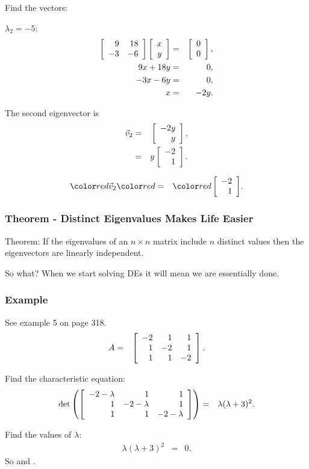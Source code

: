\begin{frame}
  Find the vectors:

  $\lambda_2 = -5$:
  \begin{eqnarray*}
    \left[ \begin{array}{rr} 9 & 18 \\ -3 & -6 \end{array} \right] \left[ \begin{array}{r} x \\ y \end{array} \right] & = & \left[ \begin{array}{r} 0 \\ 0 \end{array} \right], \\
    9x + 18y & = & 0, \\
    -3x - 6y & = & 0, \\
    x & = & -2 y.
  \end{eqnarray*}

  The second eigenvector is 
  \begin{eqnarray*}
    \vec{v}_2 & = & \left[ \begin{array}{r} -2y \\ y \end{array} \right], \\
    & = & y \left[ \begin{array}{r} -2 \\ 1 \end{array} \right].
  \end{eqnarray*}

  \begin{eqnarray*}
    \redText{\vec{v}_2} & \redText{=} & \redText{\vecTwo{-2}{1}}.
  \end{eqnarray*}

\end{frame}



\begin{frame}
  \frametitle{Theorem - Distinct Eigenvalues Makes Life Easier}

  Theorem: If the eigenvalues of an $n\times n$ matrix include $n$
  distinct values then the eigenvectors are linearly independent.

  \vfill

  {
    So what? When we start solving DEs it will mean we are essentially
    done. 
  }

  \vfill

\end{frame}



\begin{frame}
  \frametitle{Example}

  See example 5 on page 318.
  \begin{eqnarray*}
    A & = & \left[ \begin{array}{rrr} -2 & 1 & 1 \\ 1 & -2 & 1 \\ 1 & 1 & -2 \end{array} \right].
  \end{eqnarray*}

  Find the characteristic equation:
  \begin{eqnarray*}
    \det\left(\left[ \begin{array}{rrr} -2-\lambda & 1 & 1 \\ 1 & -2-\lambda & 1 \\ 1 & 1 & -2-\lambda \end{array} \right]\right)
    & = & \lambda (\lambda+3)^2.
  \end{eqnarray*}

  Find the values of $\lambda$:
  \begin{eqnarray*}
    \lambda (\lambda+3)^2 & = & 0.
  \end{eqnarray*}
  So  and .


\end{frame}



